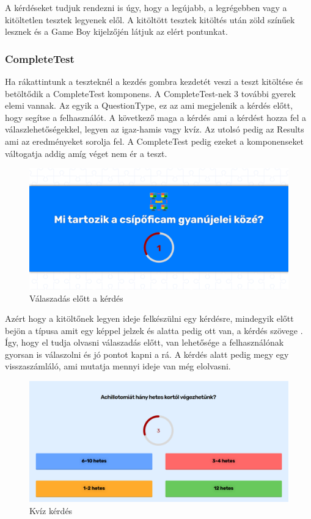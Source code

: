 A kérdéseket tudjuk rendezni is úgy, hogy a legújabb, a legrégebben vagy a kitöltetlen tesztek legyenek elől.
A kitöltött tesztek kitöltés után zöld színűek lesznek és a Game Boy kijelzőjén látjuk az elért pontunkat.

\subsubsection{CompleteTest}

Ha rákattintunk a teszteknél a kezdés gombra kezdetét veszi a teszt kitöltése és betöltődik a CompleteTest komponens. A CompleteTest-nek 3 további gyerek elemi vannak. Az egyik a QuestionType, ez az ami megjelenik a kérdés előtt, hogy segítse a felhasználót. A következő maga a kérdés ami a kérdést hozza fel a válaszlehetőségekkel, legyen az igaz-hamis vagy kvíz. Az utolsó pedig az Results ami az eredményeket sorolja fel. A CompleteTest pedig ezeket a komponenseket váltogatja addig amíg véget nem ér a teszt.

\begin{figure}[H]
    \centering
    \includegraphics[width=\linewidth]{images/question_type.png}
    \caption{Válaszadás előtt a kérdés}
    \label{fig:question_type}
\end{figure}

Azért hogy a kitöltőnek legyen ideje felkészülni egy kérdésre, mindegyik előtt bejön a típusa amit egy képpel jelzek és alatta pedig ott van, a kérdés szövege . Így, hogy el tudja olvasni válaszadás előtt, van lehetősége a felhasználónak gyorsan is válaszolni és jó pontot kapni a rá. A kérdés alatt pedig megy egy visszaszámláló, ami mutatja mennyi ideje van még elolvasni.

\begin{figure}[H]
    \centering
    \includegraphics[width=\linewidth]{images/question1.png}
    \caption{Kvíz kérdés}
    \label{fig:question1}
\end{figure}

